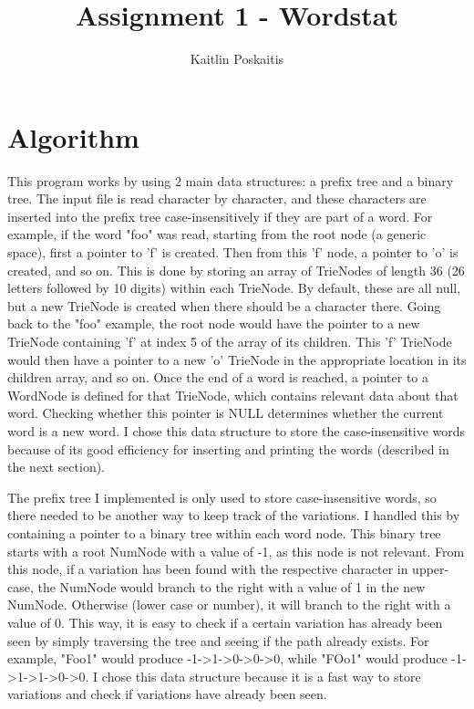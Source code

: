 \documentclass[11pt]{article}
\title{\bf Assignment 1 - Wordstat}
\author{Kaitlin Poskaitis}
\date{}
\begin{document}
\maketitle

\section*{Algorithm}

This program works by using 2 main data structures: a prefix tree and a binary
tree. The input file is read character by character, and these characters are
inserted into the prefix tree case-insensitively if they are part of a word.
For example, if the
word "foo" was read, starting from the root node (a generic space), first a
pointer to 'f' is created. Then from this 'f' node, a pointer to 'o' is
created, and so on.  This is done by storing an array of TrieNodes of length 36
(26 letters followed by 10 digits) within each TrieNode. By default, these are 
all null, but a new TrieNode is created when there should be a character there.
Going back to the "foo" example, the root node would have the pointer to a new 
TrieNode containing 'f' at index 5 of the array of its children.  This 'f' 
TrieNode would then have a pointer to a new 'o' TrieNode in the appropriate
location in its children array, and so on.
Once the end of a word is reached, a pointer to a WordNode is defined for that
TrieNode, which contains relevant data about that word. Checking whether this
pointer is NULL determines whether the current word is a new word.
I chose this data structure to store 
the case-insensitive words because of its good efficiency for inserting and
printing the words (described in the next section).

The prefix tree I implemented is only used to store case-insensitive words, so
there needed to be another way to keep track of the variations. I handled this 
by containing a pointer to a binary tree within each word node. This binary tree
starts with a root NumNode with a value of -1, as this node is not relevant.
From this node, if a variation has been found with the respective character in
upper-case, the NumNode would branch to the right with a value of 1 in the new
NumNode. Otherwise (lower case or number), it will branch to the right with a 
value of 0. This way, it is easy to check if a certain variation has already
been seen by simply traversing the tree and seeing if the path already exists.
For example, "Foo1" would produce -1->1->0->0->0, while "FOo1" would produce
-1->1->1->0->0. I chose this data structure because it is a fast way to store 
variations and check if variations have already been seen.
\end{document}
